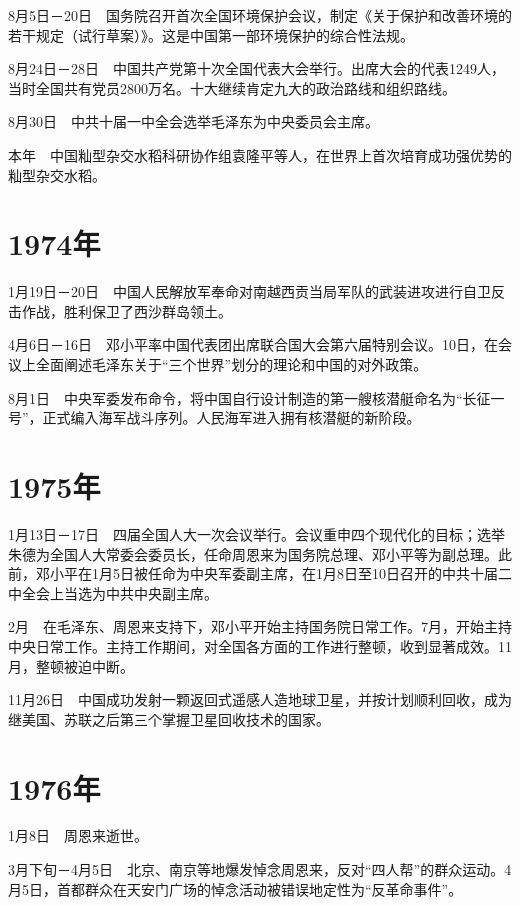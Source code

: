 \documentclass[10pt,a4paper,twocolumn]{book}
\begin{document}
8月5日－20日　国务院召开首次全国环境保护会议，制定《关于保护和改善环境的若干规定（试行草案）》。这是中国第一部环境保护的综合性法规。

8月24日－28日　中国共产党第十次全国代表大会举行。出席大会的代表1249人，当时全国共有党员2800万名。十大继续肯定九大的政治路线和组织路线。

8月30日　中共十届一中全会选举毛泽东为中央委员会主席。

本年　中国籼型杂交水稻科研协作组袁隆平等人，在世界上首次培育成功强优势的籼型杂交水稻。

\section{1974年}

1月19日－20日　中国人民解放军奉命对南越西贡当局军队的武装进攻进行自卫反击作战，胜利保卫了西沙群岛领土。

4月6日－16日　邓小平率中国代表团出席联合国大会第六届特别会议。10日，在会议上全面阐述毛泽东关于“三个世界”划分的理论和中国的对外政策。

8月1日　中央军委发布命令，将中国自行设计制造的第一艘核潜艇命名为“长征一号”，正式编入海军战斗序列。人民海军进入拥有核潜艇的新阶段。

\section{1975年}

1月13日－17日　四届全国人大一次会议举行。会议重申四个现代化的目标；选举朱德为全国人大常委会委员长，任命周恩来为国务院总理、邓小平等为副总理。此前，邓小平在1月5日被任命为中央军委副主席，在1月8日至10日召开的中共十届二中全会上当选为中共中央副主席。

2月　在毛泽东、周恩来支持下，邓小平开始主持国务院日常工作。7月，开始主持中央日常工作。主持工作期间，对全国各方面的工作进行整顿，收到显著成效。11月，整顿被迫中断。

11月26日　中国成功发射一颗返回式遥感人造地球卫星，并按计划顺利回收，成为继美国、苏联之后第三个掌握卫星回收技术的国家。

\section{1976年}

1月8日　周恩来逝世。

3月下旬－4月5日　北京、南京等地爆发悼念周恩来，反对“四人帮”的群众运动。4月5日，首都群众在天安门广场的悼念活动被错误地定性为“反革命事件”。
\end{document}
